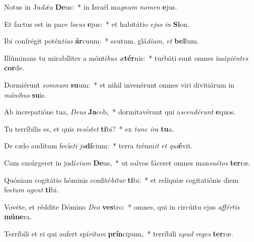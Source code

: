 \item Notus in Ju\textit{dǽ}\textit{a} \textbf{De}us:~* in Israël ma\textit{gnum} \textit{no}\textit{men} \textbf{e}jus.
\item Et factus est in pace \textit{lo}\textit{cus} \textbf{e}jus:~* et habitátio \textit{e}\textit{jus} \textit{in} \textbf{Si}on.
\item Ibi confrégit potén\textit{ti}\textit{as} \textbf{ár}cuum:~* scutum, glá\textit{di}\textit{um}, \textit{et} \textbf{bel}lum.
\item Illúminans tu mirabíliter a mónti\textit{bus} \textit{æ}\textbf{tér}nis:~* turbáti sunt omnes insi\textit{pi}\textit{én}\textit{tes} \textbf{cor}de.
\item Dormiérunt \textit{som}\textit{num} \textbf{su}um:~* et nihil invenérunt omnes viri divitiárum in \textit{má}\textit{ni}\textit{bus} \textbf{su}is.
\item Ab increpatióne tua, \textit{De}\textit{us} \textbf{Ja}cob,~* dormitavérunt qui a\textit{scen}\textit{dé}\textit{runt} \textbf{e}quos.
\item Tu terríbilis es, et quis re\textit{sís}\textit{tet} \textbf{ti}bi?~* ex \textit{tunc} \textit{i}\textit{ra} \textbf{tu}a.
\item De cælo audítum fecís\textit{ti} \textit{ju}\textbf{dí}cium:~* terra trému\textit{it} \textit{et} \textit{qui}\textbf{é}vit.
\item Cum exsúrgeret in judí\textit{ci}\textit{um} \textbf{De}us,~* ut salvos fáceret omnes man\textit{su}\textit{é}\textit{tos} \textbf{ter}ræ.
\item Quóniam cogitátio hóminis confité\textit{bi}\textit{tur} \textbf{ti}bi:~* et relíquiæ cogitatiónis diem fes\textit{tum} \textit{a}\textit{gent} \textbf{ti}bi.
\item Vovéte, et réddite Dómino \textit{De}\textit{o} \textbf{ves}tro:~* omnes, qui in circúitu ejus \textit{af}\textit{fér}\textit{tis} \textbf{mú}\textbf{ne}ra.
\item Terríbili et ei qui aufert spí\textit{ri}\textit{tum} \textbf{prín}cipum,~* terríbili a\textit{pud} \textit{re}\textit{ges} \textbf{ter}ræ.
